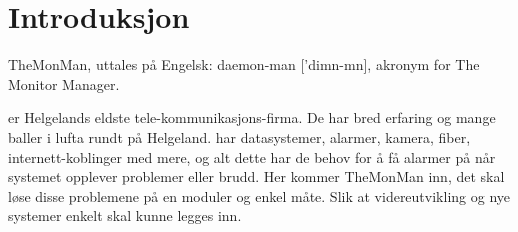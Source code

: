 \chapter{Introduksjon}
\label{chap:introduction}



%
%
%
%
%
%

TheMonMan, uttales på Engelsk: daemon-man ['dim\textschwa{}n-m\textschwa{}n], akronym for The Monitor Manager.

\TMX er Helgelands eldste tele-kommunikasjons-firma. De har bred erfaring og mange baller i lufta rundt på Helgeland. 
\TMX har datasystemer, alarmer, kamera, fiber, internett-koblinger med mere, og alt dette har de behov for å få alarmer på når systemet opplever problemer eller brudd. Her kommer TheMonMan inn, det skal løse disse problemene på en moduler og enkel måte. Slik at videreutvikling og nye systemer enkelt skal kunne legges inn.
  